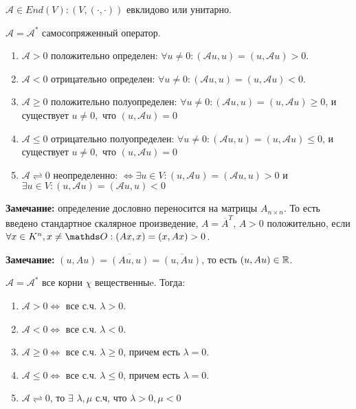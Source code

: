  $\mathcal{A} \in End(V): (V, (\cdot,\cdot))$ евклидово или унитарно.

$\mathcal{A} = \mathcal{A}^*$ самосопряженный оператор. 

\begin{enumerate}
    \item $\mathcal{A} > 0$ положительно определен: $\forall u \neq 0: (\mathcal{A}u,u) = (u, \mathcal{A}u)>0$.
     \item $\mathcal{A} < 0$ отрицательно определен: $\forall u \neq 0: (\mathcal{A}u,u) = (u, \mathcal{A}u)<0$.
     \item $\mathcal{A} \geq 0$ положительно полуопределен: $\forall u \neq 0: (\mathcal{A}u,u) = (u, \mathcal{A}u)\geq0$, и существует $u\neq 0,$ что $(u, \mathcal{A}u)=0$
     \item $\mathcal{A} \leq 0$ отрицательно полуопределен: $\forall u \neq 0: (\mathcal{A}u,u) = (u, \mathcal{A}u)\leq0$, и существует $u\neq 0,$ что $(u, \mathcal{A}u)=0$
    \item $\mathcal{A} \rightleftharpoons  0$ неопределенно: $\Leftrightarrow  \exists u \in V: (u,\mathcal{A}u) = (\mathcal{A}u,u) >0$ и  $\exists u \in V: (u,\mathcal{A}u) = (\mathcal{A}u,u)<0$
\end{enumerate}

\textbf{Замечание:} определение дословно переносится на матрицы $A_{n \times n}$. То есть введено стандартное скалярное произведение, $A = \overline{A}^T$, $A>0$ положительно, если $\forall x \in K^n, x \neq \zero: (Ax,x) = (x,Ax) > 0$.

\textbf{Замечание:} $(u,Au) = \overline{(Au, u)} = \overline{(u, Au)}$, то есть  $(u,Au) \in \mathbb{R}$.


$\mathcal{A} = \mathcal{A}^*$ все корни $\chi$ вещественныe. Тогда:

\begin{enumerate}
    \item $\mathcal{A} > 0 \Leftrightarrow$ все с.ч. $\lambda >0$. 
     \item $\mathcal{A} < 0 \Leftrightarrow$ все с.ч. $\lambda <0$. 
     \item $\mathcal{A} \geq 0 \Leftrightarrow$ все с.ч. $\lambda \geq0$, причем есть $\lambda =0 $. 
     \item $\mathcal{A} \leq0 \Leftrightarrow$ все с.ч. $\lambda \leq0$, причем есть $\lambda =0 $. 
    \item $\mathcal{A} \rightleftharpoons  0$, то $\exists $ $\lambda,\mu$ с.ч, что $\lambda >0, \mu<0$
\end{enumerate}

